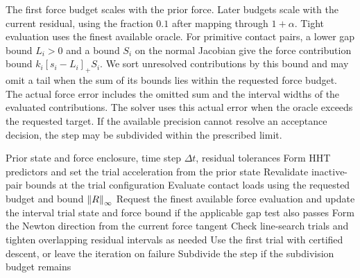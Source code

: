 The first force budget scales with the prior force. Later budgets scale with the current residual, using the fraction $0.1$ after mapping through $1+\alpha$. Tight evaluation uses the finest available oracle. For primitive contact pairs, a lower gap bound $L_i>0$ and a bound $S_i$ on the normal Jacobian give the force contribution bound $k_i[s_i-L_i]_+S_i$. We sort unresolved contributions by this bound and may omit a tail when the sum of its bounds lies within the requested force budget. The actual force error includes the omitted sum and the interval widths of the evaluated contributions. The solver uses this actual error when the oracle exceeds the requested target. If the available precision cannot resolve an acceptance decision, the step may be subdivided within the prescribed limit.

\begin{algorithm}[!htbp]
\caption{HHT trial step with bounded contact evaluation}
\label{alg:trial}
\begin{algorithmic}[1]
\Require Prior state and force enclosure, time step $\Delta t$, residual tolerances
\State Form HHT predictors and set the trial acceleration from the prior state
  \State Revalidate inactive-pair bounds at the trial configuration
  \State Evaluate contact loads using the requested budget and bound $\left\lVert R\right\rVert_{\infty}$
     \State Request the finest available force evaluation and update the interval
  \EndIf
     \State \Return trial state and force bound if the applicable gap test also passes
  \EndIf
  \State Form the Newton direction from the current force tangent
  \State Check line-search trials and tighten overlapping residual intervals as needed
  \State Use the first trial with certified descent, or leave the iteration on failure
\EndFor
\State Subdivide the step if the subdivision budget remains
\end{algorithmic}
\end{algorithm}

